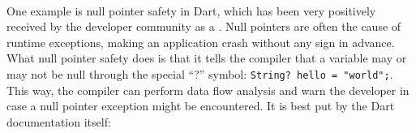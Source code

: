 \paragraph*{}
One example is null pointer safety in Dart, which has been very positively received by the developer community as a \cite[boost to productivity]{proxify-dart-null}. Null pointers are often the cause of runtime exceptions, making an application crash without any sign in advance. What null pointer safety does is that it tells the compiler that a variable may or may not be null through the special ``?'' symbol: \lstinline[columns=fixed]{String? hello = "world";}. This way, the compiler can perform data flow analysis and warn the developer in case a null pointer exception might be encountered. It is best put by the Dart documentation itself: \cite[runtime null-dereference errors turn into edit-time analysis errors.]{dart-dev-null-safety}

